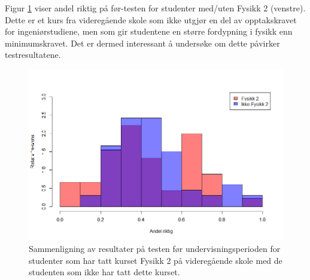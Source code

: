 \documentclass[a4paper,norsk,12pt]{article}
\begin{document}
Figur \ref{fig:fys2} viser andel riktig på før-testen for studenter med/uten Fysikk 2 (venstre). Dette er et kurs fra videregående skole som ikke utgjør en del av opptakskravet for ingeniørstudiene, men som gir studentene en større fordypning i fysikk enn minimumskravet. Det er dermed interessant å undersøke om dette påvirker testresultatene.
\begin{figure}[tp]
\begin{center}
	\includegraphics[width=.48\textwidth]{./fys2}
\end{center}
	\caption{Sammenligning av resultater på testen før undervisningsperioden for studenter som har tatt kurset Fysikk 2 på videregående skole med de studenten som ikke har tatt dette kurset.}
	\label{fig:fys2}
\end{figure}
\end{document}
